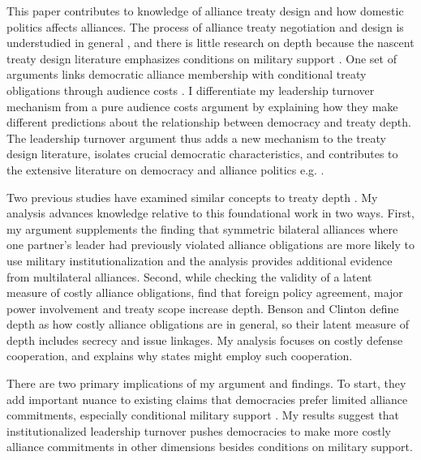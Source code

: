 \documentclass[12pt]{article}
\begin{document}
This paper contributes to knowledge of alliance treaty design and how domestic politics affects alliances.
The process of alliance treaty negotiation and design is understudied in general \citep{Poast2019a}, and there is little research on depth because the nascent treaty design literature emphasizes conditions on military support \citep{Kim2011, Benson2012, Mattes2012, Chibaetal2015, FjelstulReiter2019}.
One set of arguments links democratic alliance membership with conditional treaty obligations through audience costs \citep{Mattes2012, Chibaetal2015, FjelstulReiter2019}. 
I differentiate my leadership turnover mechanism from a pure audience costs argument by explaining how they make different predictions about the relationship between democracy and treaty depth.
The leadership turnover argument thus adds a new mechanism to the treaty design literature, isolates crucial democratic characteristics, and contributes to the extensive literature on democracy and alliance politics e.g. \citep{LaiReiter2000, Mattes2012a, McManusYarhi-Milo2017}. 


Two previous studies have examined similar concepts to treaty depth \citep{Mattes2012, BensonClinton2016}. 
My analysis advances knowledge relative to this foundational work in two ways.  
First, my argument supplements the finding that symmetric bilateral alliances where one partner's leader had previously violated alliance obligations are more likely to use military institutionalization \citep{Mattes2012} and the analysis provides additional evidence from multilateral alliances.  
Second, while checking the validity of a latent measure of costly alliance obligations, \citet{BensonClinton2016} find that foreign policy agreement, major power involvement and treaty scope increase depth. 
Benson and Clinton define depth as how costly alliance obligations are in general, so their latent measure of depth includes secrecy and issue linkages.
My analysis focuses on costly defense cooperation, and explains why states might employ such cooperation. 


There are two primary implications of my argument and findings. 
To start, they add important nuance to existing claims that democracies prefer limited alliance commitments, especially conditional military support \citep{Mattes2012, Chibaetal2015, FjelstulReiter2019}.
My results suggest that institutionalized leadership turnover pushes democracies to make more costly alliance commitments in other dimensions besides conditions on military support. 
\end{document}
